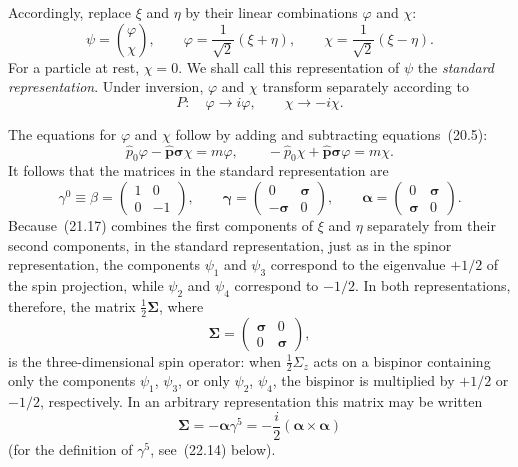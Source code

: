 Accordingly, replace $\xi$ and $\eta$ by their linear combinations $\varphi$ and $\chi$:
\begin{equation}
\psi = \binom{\varphi}{\chi},\qquad \varphi = \frac{1}{\sqrt2}(\xi+\eta),\qquad \chi = \frac{1}{\sqrt2}(\xi-\eta).
\tag{21.17}
\end{equation}
For a particle at rest, $\chi = 0$. We shall call this representation of $\psi$ the \emph{standard representation}. Under inversion, $\varphi$ and $\chi$ transform separately according to
\begin{equation}
P:\quad \varphi \to i\varphi,\qquad \chi \to -i\chi.
\tag{21.18}
\end{equation}

The equations for $\varphi$ and $\chi$ follow by adding and subtracting equations~(20.5):
\begin{equation}
\widehat p_0\varphi - \widehat{\mathbf{p}}\boldsymbol{\sigma}\chi = m\varphi,\qquad -\widehat p_0\chi + \widehat{\mathbf{p}}\boldsymbol{\sigma}\varphi = m\chi.
\tag{21.19}
\end{equation}
It follows that the matrices in the standard representation are
\begin{equation}
\gamma^0 \equiv \beta = \begin{pmatrix} 1 & 0\\ 0 & -1 \end{pmatrix},\qquad \boldsymbol{\gamma} = \begin{pmatrix} 0 & \boldsymbol{\sigma}\\ -\boldsymbol{\sigma} & 0 \end{pmatrix},\qquad \boldsymbol{\alpha} = \begin{pmatrix} 0 & \boldsymbol{\sigma}\\ \boldsymbol{\sigma} & 0 \end{pmatrix}.
\tag{21.20}
\end{equation}
Because~(21.17) combines the first components of $\xi$ and $\eta$ separately from their second components, in the standard representation, just as in the spinor representation, the components $\psi_1$ and $\psi_3$ correspond to the eigenvalue $+1/2$ of the spin projection, while $\psi_2$ and $\psi_4$ correspond to $-1/2$. In both representations, therefore, the matrix $\tfrac{1}{2}\boldsymbol{\Sigma}$, where
\begin{equation}
\boldsymbol{\Sigma} = \begin{pmatrix} \boldsymbol{\sigma} & 0\\ 0 & \boldsymbol{\sigma} \end{pmatrix},
\tag{21.21}
\end{equation}
is the three-dimensional spin operator: when $\tfrac{1}{2}\Sigma_z$ acts on a bispinor containing only the components $\psi_1$, $\psi_3$, or only $\psi_2$, $\psi_4$, the bispinor is multiplied by $+1/2$ or $-1/2$, respectively. In an arbitrary representation this matrix may be written
\begin{equation}
\boldsymbol{\Sigma} = -\boldsymbol{\alpha}\gamma^5 = -\frac{i}{2}(\boldsymbol{\alpha}\times\boldsymbol{\alpha})
\tag{21.22}
\end{equation}
(for the definition of $\gamma^5$, see~(22.14) below).

